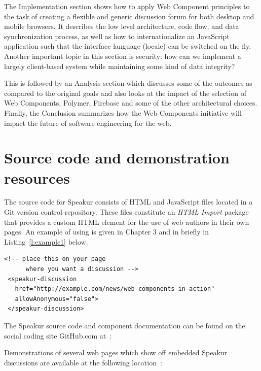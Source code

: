 The Implementation section shows how to apply Web Component principles to the task of creating a flexible and generic discussion forum for both desktop and mobile browsers. 
It describes the low level architecture, code flow, and data synchronization process, 
as well as how to internationalize an JavaScript application such that the interface language (locale) can be switched on the fly.
Another important topic in this section is security: how can we implement a largely client-based system while maintaining some kind of data integrity?

This is followed by an Analysis section which discusses some of the outcomes 
as compared to the original goals and also looks at the impact of the selection of Web Components, 
Polymer, Firebase and some of the other architectural choices. 
Finally, the Conclusion summarizes how the Web Components initiative will impact the future of software engineering for the web. 

\section{Source code and demonstration resources}
%

The source code for Speakur consists of HTML and JavaScript files located in a Git version control repository. 
These files constitute an \textit{HTML Import} package that provides a
\textbf{}
custom HTML element for the use of web authors in their own pages.
An example of using  is given in Chapter 3 and in briefly in Listing~\ref{l:example1} below.

\begin{lstlisting}[language=HTML5,caption={Speakur custom HTML element},label=l:example1]
 <!-- place this on your page
      where you want a discussion -->
 <speakur-discussion
   href="http://example.com/news/web-components-in-action"
   allowAnonymous="false">
 </speakur-discussion>
\end{lstlisting}

The Speakur source code and component documentation can be found on the social coding site GitHub.com at~\cite{landers2015-b}:


Demonstrations of several web pages which show off embedded Speakur discussions are available at the following location~\cite{landers2015-c}:

